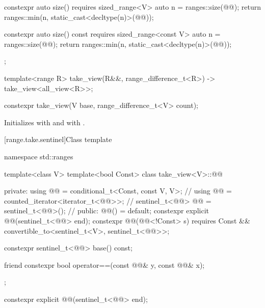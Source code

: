 \begin{codeblock}
{{    constexpr auto size() requires sized_range<V> {
      auto n = ranges::size(@@);
      return ranges::min(n, static_cast<decltype(n)>(@@));
    }

    constexpr auto size() const requires sized_range<const V> {
      auto n = ranges::size(@@);
      return ranges::min(n, static_cast<decltype(n)>(@@));
    }
  };

  template<range R>
    take_view(R&&, range_difference_t<R>)
      -> take_view<all_view<R>>;
}
\end{codeblock}

%
\begin{itemdecl}
constexpr take_view(V base, range_difference_t<V> count);
\end{itemdecl}

\begin{itemdescr}
\pnum
\effects
Initializes  with  and
 with .
\end{itemdescr}

[range.take.sentinel]{Class template }

%
\begin{codeblock}
namespace std::ranges {
  template<class V>
  template<bool Const>
  class take_view<V>::@@ {
  private:
    using @@ = conditional_t<Const, const V, V>;      // \expos
    using @@ = counted_iterator<iterator_t<@@>>;      // \expos
    sentinel_t<@@> @@ = sentinel_t<@@>();         // \expos
  public:
    @@() = default;
    constexpr explicit @@(sentinel_t<@@> end);
    constexpr @@(@@<!Const> s)
      requires Const && convertible_to<sentinel_t<V>, sentinel_t<@@>>;

    constexpr sentinel_t<@@> base() const;

    friend constexpr bool operator==(const @@& y, const @@& x);
  };
}
\end{codeblock}

%
\begin{itemdecl}
constexpr explicit @@(sentinel_t<@@> end);
\end{itemdecl}


